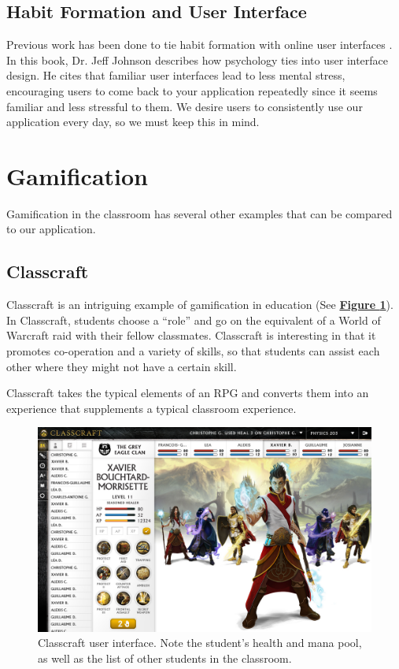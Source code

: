 \subsection{Habit Formation and User Interface}
Previous work has been done to tie habit formation with online user interfaces \cite{johnson2013designing}. In this book, Dr. Jeff Johnson describes how psychology ties into user interface design. He cites that familiar user interfaces lead to less mental stress, encouraging users to come back to your application repeatedly since it seems familiar and less stressful to them. We desire users to consistently use our application every day, so we must keep this in mind. 


\section{Gamification}
Gamification in the classroom has several other examples that can be compared to our application.

\subsection{Classcraft}
Classcraft is an intriguing example of gamification in education (See \textbf{\hyperref[fig:classcraft]{Figure \ref*{fig:classcraft}}}). In Classcraft, students choose a ``role'' and go on the equivalent of a World of Warcraft raid with their fellow classmates. Classcraft is interesting in that it promotes co-operation and a variety of skills, so that students can assist each other where they might not have a certain skill. 

Classcraft takes the typical elements of an RPG and converts them into an experience that supplements a typical classroom experience.

\begin{figure}[h]
	\includegraphics[width=1.0\linewidth]{figures/classcraft}
	\caption{Classcraft user interface. Note the student's health and mana pool, as well as the list of other students in the classroom.}
	\label{fig:classcraft}
\end{figure}

